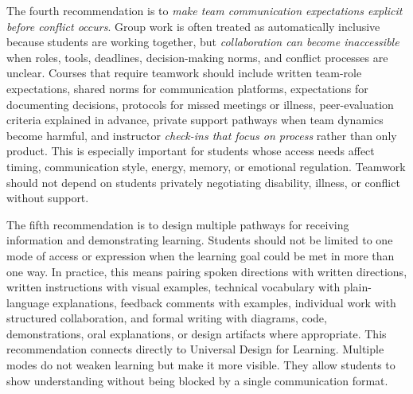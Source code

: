 
The fourth recommendation is to \textit{make team communication expectations explicit before conflict occurs}. Group work is often treated as automatically inclusive because students are working together, but \textit{collaboration can become inaccessible} when roles, tools, deadlines, decision-making norms, and conflict processes are unclear. Courses that require teamwork should include written team-role expectations, shared norms for communication platforms, expectations for documenting decisions, protocols for missed meetings or illness, peer-evaluation criteria explained in advance, private support pathways when team dynamics become harmful, and instructor \textit{check-ins that focus on process} rather than only product. This is especially important for students whose access needs affect timing, communication style, energy, memory, or emotional regulation. Teamwork should not depend on students privately negotiating disability, illness, or conflict without support.


The fifth recommendation is to design multiple pathways for receiving information and demonstrating learning. Students should not be limited to one mode of access or expression when the learning goal could be met in more than one way. In practice, this means pairing spoken directions with written directions, written instructions with visual examples, technical vocabulary with plain-language explanations, feedback comments with examples, individual work with structured collaboration, and formal writing with diagrams, code, demonstrations, oral explanations, or design artifacts where appropriate. This recommendation connects directly to Universal Design for Learning. Multiple modes do not weaken learning but make it more visible. They allow students to show understanding without being blocked by a single communication format.


